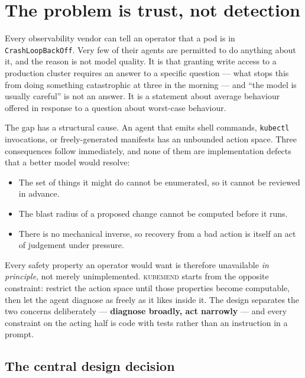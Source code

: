 \documentclass[11pt,a4paper]{article}
\newcommand{\code}[1]{\texttt{\small #1}}
\newcommand{\kubemend}{\textsc{kubemend}}
\begin{document}
\tableofcontents
\newpage

\section{The problem is trust, not detection}

Every observability vendor can tell an operator that a pod is in
\code{CrashLoopBackOff}. Very few of their agents are permitted to do anything
about it, and the reason is not model quality. It is that granting write access
to a production cluster requires an answer to a specific question --- what stops
this from doing something catastrophic at three in the morning --- and
``the model is usually careful'' is not an answer. It is a statement about
average behaviour offered in response to a question about worst-case behaviour.

The gap has a structural cause. An agent that emits shell commands, \code{kubectl}
invocations, or freely-generated manifests has an unbounded action space. Three
consequences follow immediately, and none of them are implementation defects
that a better model would resolve:

\begin{itemize}
  \item The set of things it might do cannot be enumerated, so it cannot be reviewed in advance.
  \item The blast radius of a proposed change cannot be computed before it runs.
  \item There is no mechanical inverse, so recovery from a bad action is itself an act of judgement under pressure.
\end{itemize}

Every safety property an operator would want is therefore unavailable
\emph{in principle}, not merely unimplemented. \kubemend{} starts from the
opposite constraint: restrict the action space until those properties become
computable, then let the agent diagnose as freely as it likes inside it. The
design separates the two concerns deliberately --- \textbf{diagnose broadly, act
narrowly} --- and every constraint on the acting half is code with tests rather
than an instruction in a prompt.

\subsection{The central design decision}
\end{document}
